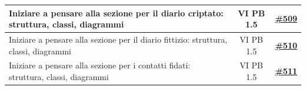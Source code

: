 \documentclass[a4paper,12pt]{article}
\newcommand{\ignoreglossary}{}
\begin{document}
\begin{longtable}{|>{\raggedright\arraybackslash}p{}|c|c|}
\hline
\rowcolor{white}
Iniziare a pensare alla sezione per il diario criptato: struttura, classi, diagrammi & VI \ignoreglossary{PB} 1.5 & \href{https://github.com/SWE-BitByBit/SWE-docs/issues/509}{\textbf{\#509}} \\
\hline
\rowcolor{gray!20}
Iniziare a pensare alla sezione per il diario fittizio: struttura, classi, diagrammi & VI \ignoreglossary{PB} 1.5 & \href{https://github.com/SWE-BitByBit/SWE-docs/issues/510}{\textbf{\#510}} \\
\hline
\rowcolor{white}
Iniziare a pensare alla sezione per i contatti fidati: struttura, classi, diagrammi & VI \ignoreglossary{PB} 1.5 & \href{https://github.com/SWE-BitByBit/SWE-docs/issues/511}{\textbf{\#511}} \\
\hline
\end{longtable}
\normalsize
\end{document}
